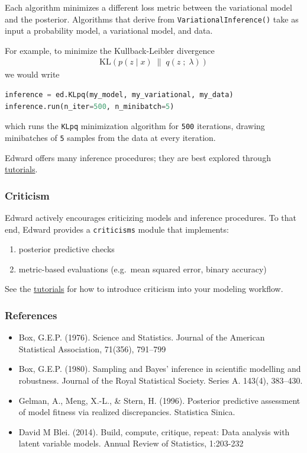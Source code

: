 Each algorithm minimizes a different loss metric between the variational model
and the posterior. Algorithms that derive from \texttt{VariationalInference()}
take as input a probability model, a variational model, and data. 

For example, to minimize the Kullback-Leibler divergence
\begin{align*}
  \text{KL}(p(z \mid x) \;\|\; q(z \;;\; \lambda))
\end{align*}
we would write
\begin{lstlisting}[language=Python]
inference = ed.KLpq(my_model, my_variational, my_data)
inference.run(n_iter=500, n_minibatch=5)
\end{lstlisting}
which runs the \texttt{KLpq} minimization algorithm for \texttt{500} iterations,
drawing minibatches of \texttt{5} samples from the data at every iteration.

Edward offers many inference procedures; they are best explored through 
\href{tutorials.html}{tutorials}.

\subsubsection{Criticism}\label{criticism}

Edward actively encourages criticizing models and inference procedures. To that
end, Edward provides a \texttt{criticisms} module that implements:
\begin{enumerate}
  \item posterior predictive checks
  \item metric-based evaluations (e.g.~mean squared error, binary accuracy)
\end{enumerate}

See the \href{tutorials.html}{tutorials} for how to introduce criticism into
your modeling workflow.

\subsubsection{References}\label{references}

\begin{itemize}
\item 
  Box, G.E.P. (1976). Science and Statistics. Journal of the American
  Statistical Association, 71(356), 791–799
\item
  Box, G.E.P. (1980). Sampling and Bayes' inference in scientific modelling and
  robustness. Journal of the Royal Statistical Society. Series A. 143(4), 383–430.
\item 
  Gelman, A., Meng, X.-L., \& Stern, H. (1996). Posterior predictive assessment
  of model fitness via realized discrepancies. Statistica Sinica.
\item
  David M Blei. (2014). Build, compute, critique, repeat: Data analysis with
  latent variable models. Annual Review of Statistics, 1:203-232
\end{itemize}
